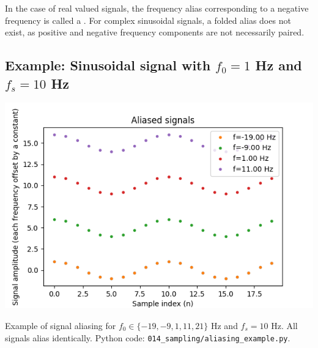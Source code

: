 In the case of real valued signals, the frequency alias corresponding to a negative frequency is called a \emph{}. 
For complex sinusoidal signals, a folded alias does not exist, as positive and negative frequency components are not necessarily paired.

\subsection{Example: Sinusoidal signal with $f_0=1$ Hz and $f_s=10$ Hz}
\begin{marginfigure}
  \begin{center}
    \includegraphics[width=\textwidth]{code/014_sampling/aliased_signals.png}
  \end{center}
  \caption{Example of signal aliasing for $f_0\in \{-19,-9,1,11,21\}$
    Hz and $f_s=10$ Hz. All signals alias identically. Python code:
    \texttt{014\_sampling/aliasing\_example.py}.}
\end{marginfigure}

